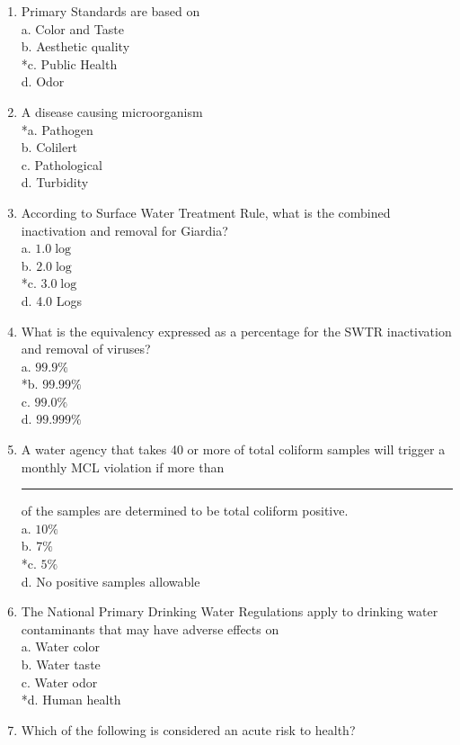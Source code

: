 \begin{enumerate}[1.]
\item Primary Standards are based on\\
a. Color and Taste\\
b. Aesthetic quality\\
*c. Public Health\\
d. Odor\\
\item A disease causing microorganism\\
*a. Pathogen\\
b. Colilert\\
c. Pathological\\
d. Turbidity\\
\item According to Surface Water Treatment Rule, what is the combined inactivation and removal for Giardia?\\
a. $1.0 \log$\\
b. $2.0 \log$\\
*c. $3.0 \log$\\
d. 4.0 Logs\\
\item What is the equivalency expressed as a percentage for the SWTR inactivation and removal of viruses?\\
a. $99.9 \%$\\
*b. $99.99 \%$\\
c. $99.0 \%$\\
d. $99.999 \%$\\
\item A water agency that takes 40 or more of total coliform samples will trigger a monthly MCL violation if more than \rule{1.5cm}{0.5pt} of the samples are determined to be total coliform positive.\\
a. $10 \%$\\
b. $7 \%$\\
*c. $5 \%$\\
d. No positive samples allowable\\
\item The National Primary Drinking Water Regulations apply to drinking water contaminants that may have adverse effects on\\
a. Water color\\
b. Water taste\\
c. Water odor\\
*d. Human health\\
\item Which of the following is considered an acute risk to health?\\

\end{enumerate}
